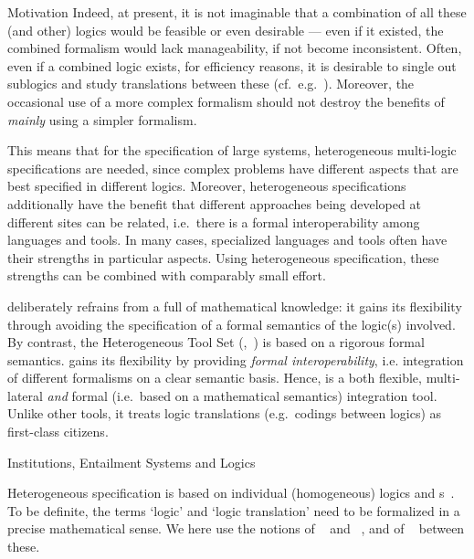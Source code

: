 \begin{omgroup}[short=HETS,
   creators={mossakowski,maeder,luettich}]
\begin{omgroup}{Motivation}
Indeed, at present, it is not imaginable that a combination of all these (and other)
logics would be feasible or even desirable --- even if it existed, the combined formalism
would lack manageability, if not become inconsistent. Often, even if a combined logic
exists, for efficiency reasons, it is desirable to single out sublogics and study
translations between these (cf.\ e.g.~\cite{Schneider04}).  Moreover, the occasional use
of a more complex formalism should not destroy the benefits of \emph{mainly} using a
simpler formalism.

This means that for the specification of large systems, heterogeneous multi-logic
specifications are needed, since complex problems have
different aspects that are best specified in different logics.  Moreover, heterogeneous
specifications additionally have the benefit that different approaches being developed at
different sites can be related, i.e.\ there is a formal interoperability among languages
and tools.  In many cases, specialized languages and tools often have their strengths in
particular aspects. Using heterogeneous specification, these strengths can be combined
with comparably small effort.

{\omdoc} deliberately refrains from a full {} of mathematical
knowledge: it gains its flexibility through avoiding the specification of a formal
semantics of the logic(s) involved. By contrast, the Heterogeneous Tool Set
({\hets},~\cite{hets06}) is based on a rigorous formal semantics. {\hets} gains its
flexibility by providing \emph{formal interoperability}, i.e. integration of different
formalisms on a clear semantic basis.  Hence, {\hets} is a both flexible, multi-lateral
\emph{and} formal (i.e.\ based on a mathematical semantics) integration tool. Unlike other
tools, it treats logic translations (e.g.\ codings between logics) as first-class
citizens.
\end{omgroup}

\begin{omgroup}{Institutions, Entailment Systems and Logics}

Heterogeneous specification is based on individual (homogeneous) logics and
{s}~\cite{MossakowskiHabil}. To be definite, the terms `logic'
and `logic translation' need to be formalized in a precise mathematical sense.  We here
use the notions of {\emph{}}~\cite{GoguenBurstall92} and
{\emph{}}~\cite{Meseguer89}, and of
{\emph{}}~\cite{GoguenRosu02} between these.


\end{omgroup}
\end{omgroup}
